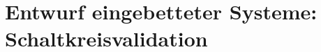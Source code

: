 \chapter{Entwurf eingebetteter Systeme: Schaltkreisvalidation}
	
	\def \Path {/media/Daten/Studium/Skripte/TechnischeInformatik/resources/Praktikum/Mikrorechner/Protokolle}
	
	
	\newpage
	
	
	\newpage
	
	
	\newpage
	
	
	\newpage
	
	\def \Path {/media/Daten/Studium/Skripte/TechnischeInformatik}
